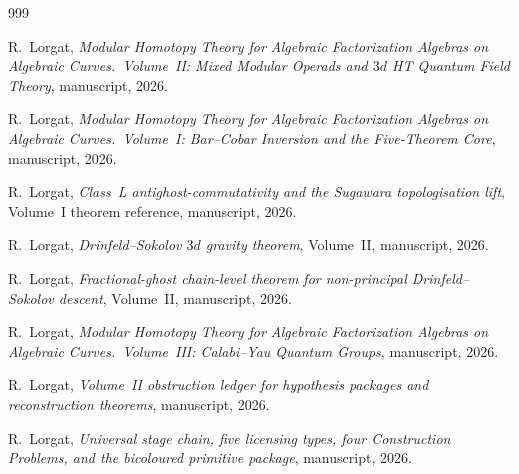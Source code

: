 \documentclass[11pt]{memoir}
\begin{document}
\begin{thebibliography}{999}

R.~Lorgat, \emph{Modular Homotopy Theory for Algebraic Factorization Algebras on Algebraic Curves.\ Volume~II: Mixed Modular Operads and $3d$ HT Quantum Field Theory}, manuscript, 2026.

R.~Lorgat, \emph{Modular Homotopy Theory for Algebraic Factorization Algebras on Algebraic Curves.\ Volume~I: Bar--Cobar Inversion and the Five-Theorem Core}, manuscript, 2026.

R.~Lorgat, \emph{Class~L antighost-commutativity and the Sugawara topologisation lift}, Volume~I theorem reference, manuscript, 2026.

R.~Lorgat, \emph{Drinfeld--Sokolov $3d$ gravity theorem}, Volume~II, manuscript, 2026.

R.~Lorgat, \emph{Fractional-ghost chain-level theorem for non-principal Drinfeld--Sokolov descent}, Volume~II, manuscript, 2026.

R.~Lorgat, \emph{Modular Homotopy Theory for Algebraic Factorization Algebras on Algebraic Curves.\ Volume~III: Calabi--Yau Quantum Groups}, manuscript, 2026.

R.~Lorgat, \emph{Volume~II obstruction ledger for hypothesis packages and reconstruction theorems}, manuscript, 2026.

R.~Lorgat, \emph{Universal stage chain, five licensing types, four Construction Problems, and the bicoloured primitive package}, manuscript, 2026.

\end{thebibliography}
\end{document}
